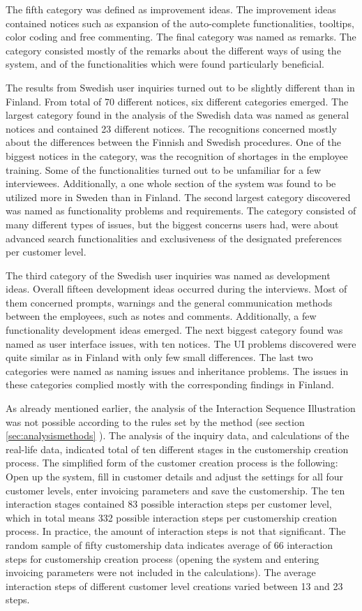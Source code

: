 \documentclass[12pt,a4paper,oneside,pdftex]{report}
\begin{document}
The fifth category was defined as improvement ideas. The improvement ideas contained notices such as expansion of the auto-complete functionalities, tooltips, color coding and free commenting. The final category was named as remarks. The category consisted mostly of the remarks about the different ways of using the system, and of the functionalities which were found particularly beneficial.   
    
The results from Swedish user inquiries turned out to be slightly different than in Finland. From total of 70 different notices, six different categories emerged. The largest category found in the analysis of the Swedish data was named as general notices and contained 23 different notices. The recognitions concerned mostly about the differences between the Finnish and Swedish procedures. One of the biggest notices in the category, was the recognition of shortages in the employee training. Some of the functionalities turned out to be unfamiliar for a few interviewees. Additionally, a one whole section of the system was found to be utilized more in Sweden than in Finland. The second largest category discovered was named as functionality problems and requirements. The category consisted of many different types of issues, but the biggest concerns users had, were about advanced search functionalities and exclusiveness of the designated preferences per customer level. 

The third category of the Swedish user inquiries was named as development ideas. Overall fifteen development ideas occurred during the interviews. Most of them concerned prompts, warnings and the general communication methods between the employees, such as notes and comments. Additionally, a few functionality development ideas emerged. The next biggest category found was named as user interface issues, with ten notices. The UI problems discovered were quite similar as in Finland with only few small differences. The last two categories were named as naming issues and inheritance problems. The issues in these categories complied mostly with the corresponding findings in Finland. 

As already mentioned earlier, the analysis of the Interaction Sequence Illustration was not possible according to the rules set by the method (see section \ref{sec:analysismethods} ). The analysis of the inquiry data, and calculations of the real-life data, indicated total of ten different stages in the customership creation process. The simplified form of the customer creation process is the following: Open up the system, fill in customer details and adjust the settings for all four customer levels, enter invoicing parameters and save the customership. The ten interaction stages contained 83 possible interaction steps per customer level, which in total means 332 possible interaction steps per customership creation process. In practice, the amount of interaction steps is not that significant. The random sample of fifty customership data indicates average of 66 interaction steps for customership creation process (opening the system and entering invoicing parameters were not included in the calculations). The average interaction steps of different customer level creations varied between 13 and 23 steps.   
\end{document}
